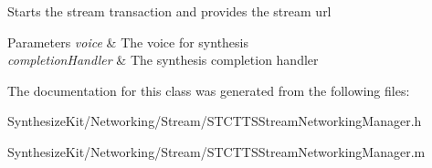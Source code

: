Starts the stream transaction and provides the stream url 
\begin{DoxyParams}{Parameters}
{\em voice} & The voice for synthesis \\
\hline
{\em completion\+Handler} & The synthesis completion handler \\
\hline
\end{DoxyParams}


The documentation for this class was generated from the following files\+:\begin{DoxyCompactItemize}
\item 
Synthesize\+Kit/\+Networking/\+Stream/S\+T\+C\+T\+T\+S\+Stream\+Networking\+Manager.\+h\item 
Synthesize\+Kit/\+Networking/\+Stream/S\+T\+C\+T\+T\+S\+Stream\+Networking\+Manager.\+m\end{DoxyCompactItemize}
